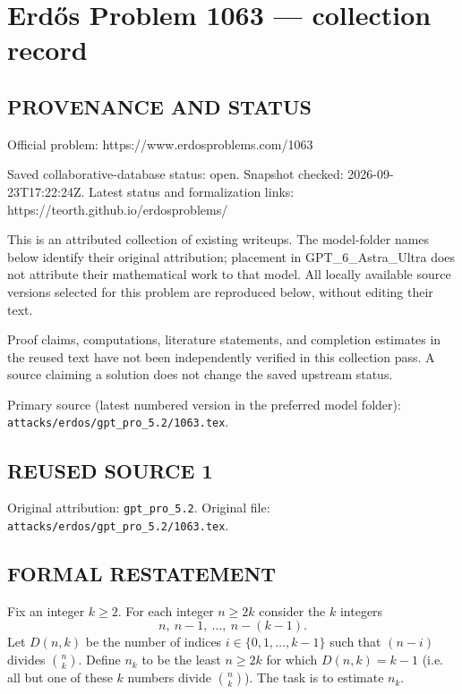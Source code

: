 \section*{Erd\H{o}s Problem 1063 --- collection record}

\subsection*{PROVENANCE AND STATUS}
Official problem: https://www.erdosproblems.com/1063

Saved collaborative-database status: open.
Snapshot checked: 2026-09-23T17:22:24Z.
Latest status and formalization links: https://teorth.github.io/erdosproblems/

This is an attributed collection of existing writeups. The model-folder names below identify their original attribution; placement in GPT\_6\_Astra\_Ultra does not attribute their mathematical work to that model. All locally available source versions selected for this problem are reproduced below, without editing their text.

Proof claims, computations, literature statements, and completion estimates in the reused text have not been independently verified in this collection pass. A source claiming a solution does not change the saved upstream status.

Primary source (latest numbered version in the preferred model folder): \texttt{attacks/erdos/gpt\_pro\_5.2/1063.tex}.

\subsection*{REUSED SOURCE 1}
Original attribution: \texttt{gpt\_pro\_5.2}.
Original file: \texttt{attacks/erdos/gpt\_pro\_5.2/1063.tex}.


\subsection*{FORMAL RESTATEMENT}
Fix an integer $k\ge 2$. For each integer $n\ge 2k$ consider the $k$ integers
\[
 n,\ n-1,\ \dots,\ n-(k-1).
\]
Let $D(n,k)$ be the number of indices $i\in\{0,1,\dots,k-1\}$ such that $(n-i)$ divides $\binom{n}{k}$.
Define $n_k$ to be the least $n\ge 2k$ for which $D(n,k)=k-1$ (i.e. all but one of these $k$ numbers divide $\binom{n}{k}$).
The task is to estimate $n_k$.

